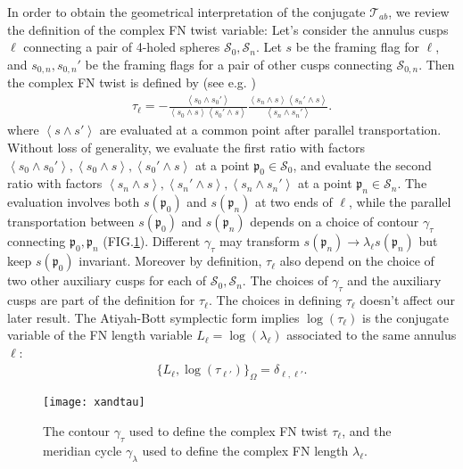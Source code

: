 \documentclass[aps,prd,notitlepage,nofootinbib,superscriptaddress,groupedaddress,twocolumn]{revtex4-1}
\def\be{\begin{eqnarray}}
\def\ee{\end{eqnarray}}
\newcommand{\cs}{\mathcal S}
\newcommand{\ct}{\mathcal T}
\newcommand{\fp}{\mathfrak{p}}  \newcommand{\Fp}{\mathfrak{P}}
\newcommand{\g}{\gamma}
\renewcommand{\l}{\lambda}
\renewcommand{\O}{\Omega}
\renewcommand{\t}{\tau}
\newcommand{\lag}{\left\langle}
\newcommand{\rag}{\right\rangle}
\begin{document}
In order to obtain the geometrical interpretation of the conjugate $\ct_{ab}$, we review the definition of the complex FN twist variable: Let's consider the annulus cusps $\ell$ connecting a pair of 4-holed spheres $\cs_0,\cs_n$. Let $s$ be the framing flag for $\ell$, and $s_{0,n},s_{0,n}'$ be the framing flags for a pair of other cusps connecting $\cs_{0,n}$. Then the complex FN twist is defined by (see e.g. \cite{DGV})
\be
\t_\ell=-\frac{\lag s_{0}\wedge s_{0}'\rag}{\lag s_{0}\wedge s\rag\lag s_{0}'\wedge s \rag}\frac{\lag s_{n}\wedge s\rag\lag s_{n}'\wedge s\rag}{\lag s_{n}\wedge s_{n}'\rag}.
\ee 
where $\lag s\wedge s'\rag$ are evaluated at a common point after parallel transportation. Without loss of generality, we evaluate the first ratio with factors ${\lag s_{0}\wedge s_{0}'\rag},\lag s_{0}\wedge s\rag,\lag s_{0}'\wedge s \rag$ at a point $\fp_0 \in\cs_0$, and evaluate the second ratio with factors ${\lag s_{n}\wedge s\rag,\lag s_{n}'\wedge s\rag},{\lag s_{n}\wedge s_{n}'\rag}$ at a point $\fp_n\in\cs_n$. The evaluation involves both $s(\fp_0)$ and $s(\fp_n)$ at two ends of $\ell$, while the parallel transportation between $s(\fp_0)$ and $s(\fp_n)$ depends on a choice of contour $\g_\t$ connecting $\fp_0,\fp_n$ (FIG.\ref{xandtau}). Different $\g_\t$ may transform $s(\fp_n)\to\l_\ell s(\fp_n)$ but keep $s(\fp_0)$ invariant. Moreover by definition, $\t_\ell$ also depend on the choice of two other auxiliary cusps for each of $\cs_0,\cs_n$. The choices of $\g_\t$ and the auxiliary cusps are part of the definition for $\t_\ell$. The choices in defining $\t_\ell$ doesn't affect our later result. The Atiyah-Bott symplectic form implies $\log(\tau_\ell)$ is the conjugate variable of the FN length variable $L_\ell=\log(\l_\ell)$ associated to the same annulus $\ell$:
\be
\{L_\ell,\log(\tau_{\ell'})\}_\O=\delta_{\ell,\ell'}.
\ee



\begin{figure}[h]
\begin{center}
\texttt{[image: xandtau]}
\caption{The contour $\g_\t$ used to define the complex FN twist $\t_\ell$, and the meridian cycle $\g_\l$ used to define the complex FN length $\l_\ell$.}
\label{xandtau}
\end{center}
\end{figure}
\end{document}

